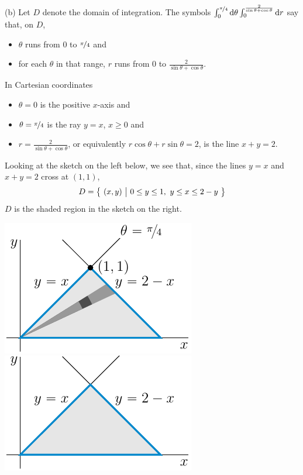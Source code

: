 \begin{solution}
(b)
Let $D$ denote the domain of integration. The symbols
$\int_0^{\nicefrac{\pi}{4}}\mathrm{d}\theta
     \int_0^{\frac{2}{\sin\theta+\cos\theta}}\mathrm{d}r$ 
say that, on $D$,
\begin{itemize}
\item 
$\theta$ runs from $0$ to $\nicefrac{\pi}{4}$ and
\item 
for each $\theta$ in that range,
$r$ runs from $0$ to $\frac{2}{\sin\theta+\cos\theta}$.
\end{itemize}
In Cartesian coordinates
\begin{itemize}
\item 
$\theta=0$ is the positive $x$-axis and
\item
$\theta=\nicefrac{\pi}{4}$ is the ray $y=x$, $x\ge 0$ and
\item 
$r=\frac{2}{\sin\theta+\cos\theta}$, or equivalently
$r\cos\theta+r\sin\theta=2$, is the line $x+y=2$.
\end{itemize}
Looking at the sketch on the left below, we see that,
since the lines $y=x$ and $x+y=2$ cross at $(1,1)$,
\begin{align*}
D=\big\{ \ (x,y)\ \big|\ 0\le y\le 1,\ y\le x\le 2-y\ \big\}
\end{align*}
$D$ is the shaded region in the sketch on the right.
\begin{center}
     \includegraphics{fig/polar6b1.pdf}\qquad\qquad
     \includegraphics{fig/polar6b2.pdf}
\end{center}



\end{solution}

